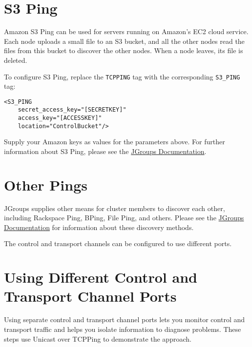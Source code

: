 \section{S3 Ping}\label{s3-ping}

Amazon S3 Ping can be used for servers running on Amazon's EC2 cloud
service. Each node uploads a small file to an S3 bucket, and all the
other nodes read the files from this bucket to discover the other nodes.
When a node leaves, its file is deleted.

To configure S3 Ping, replace the \texttt{TCPPING} tag with the
corresponding \texttt{S3\_PING} tag:

\begin{verbatim}
<S3_PING
    secret_access_key="[SECRETKEY]"
    access_key="[ACCESSKEY]"
    location="ControlBucket"/>
\end{verbatim}

Supply your Amazon keys as values for the parameters above. For further
information about S3 Ping, please see the
\href{http://www.jgroups.org/manual4/index.html\#_s3_ping}{JGroups
Documentation}.

\section{Other Pings}\label{other-pings}

JGroups supplies other means for cluster members to discover each other,
including Rackspace Ping, BPing, File Ping, and others. Please see the
\href{http://www.jgroups.org/manual4/index.html\#DiscoveryProtocols}{JGroups
Documentation} for information about these discovery methods.

The control and transport channels can be configured to use different
ports.

\section{Using Different Control and Transport Channel
Ports}\label{using-different-control-and-transport-channel-ports}

Using separate control and transport channel ports lets you monitor
control and transport traffic and helps you isolate information to
diagnose problems. These steps use Unicast over TCPPing to demonstrate
the approach.

